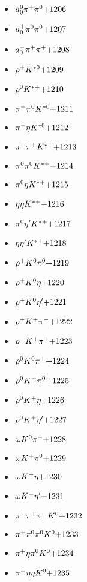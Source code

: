 \begin{multicols}{3}
\begin{itemize}
 \item $ a_{0}^{0} \pi^{+} \pi^{0} \hfill{+1206}$
 \item $ a_{0}^{+} \pi^{0} \pi^{0} \hfill{+1207}$
 \item $ a_{0}^{-} \pi^{+} \pi^{+} \hfill{+1208}$
 \item $ \rho^{+} K^{*0} \hfill{+1209}$
 \item $ \rho^{0} K^{*+} \hfill{+1210}$
 \item $ \pi^{+} \pi^{0} K^{*0} \hfill{+1211}$
 \item $ \pi^{+} \eta K^{*0} \hfill{+1212}$
 \item $ \pi^{-} \pi^{+} K^{*+} \hfill{+1213}$
 \item $ \pi^{0} \pi^{0} K^{*+} \hfill{+1214}$
 \item $ \pi^{0} \eta K^{*+} \hfill{+1215}$
 \item $ \eta \eta K^{*+} \hfill{+1216}$
 \item $ \pi^{0} {\eta^{\prime}} K^{*+} \hfill{+1217}$
 \item $ \eta {\eta^{\prime}} K^{*+} \hfill{+1218}$
 \item $ \rho^{+} K^{0} \pi^{0} \hfill{+1219}$
 \item $ \rho^{+} K^{0} \eta \hfill{+1220}$
 \item $ \rho^{+} K^{0} {\eta^{\prime}} \hfill{+1221}$
 \item $ \rho^{+} K^{+} \pi^{-} \hfill{+1222}$
 \item $ \rho^{-} K^{+} \pi^{+} \hfill{+1223}$
 \item $ \rho^{0} K^{0} \pi^{+} \hfill{+1224}$
 \item $ \rho^{0} K^{+} \pi^{0} \hfill{+1225}$
 \item $ \rho^{0} K^{+} \eta \hfill{+1226}$
 \item $ \rho^{0} K^{+} {\eta^{\prime}} \hfill{+1227}$
 \item $ \omega K^{0} \pi^{+} \hfill{+1228}$
 \item $ \omega K^{+} \pi^{0} \hfill{+1229}$
 \item $ \omega K^{+} \eta \hfill{+1230}$
 \item $ \omega K^{+} {\eta^{\prime}} \hfill{+1231}$
 \item $ \pi^{+} \pi^{+} \pi^{-} K^{0} \hfill{+1232}$
 \item $ \pi^{+} \pi^{0} \pi^{0} K^{0} \hfill{+1233}$
 \item $ \pi^{+} \eta \pi^{0} K^{0} \hfill{+1234}$
 \item $ \pi^{+} \eta \eta K^{0} \hfill{+1235}$

\end{itemize}
\end{multicols}
